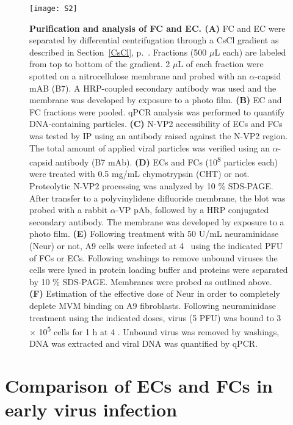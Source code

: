 \begin{figure}
\centering
  \texttt{[image: S2]}
  \caption[Purification and analysis of FC and EC.]
   {\textbf{Purification and analysis of FC and EC. (A)} FC and EC were separated by differential centrifugation through a CsCl gradient as described in Section~\ref{CsCl}, p.~\pageref{CsCl}. Fractions (500 $\mu$L each) are labeled from top to bottom of the gradient. 2 $\mu$L of each fraction were spotted on a nitrocellulose membrane and probed with an $\alpha$-capsid mAB (B7). A HRP-coupled secondary antibody was used and the membrane was developed by exposure to a photo film. \textbf{(B)} EC and FC fractions were pooled. qPCR analysis was performed to quantify DNA-containing particles. \textbf{(C)} N-VP2 accessibility of ECs and FCs was tested by IP using an antibody raised against the N-VP2 region. The total amount of applied viral particles was verified using an $\alpha$-capsid antibody (B7 mAb). \textbf{(D)} ECs and FCs (10\textsuperscript{8} particles each) were treated with 0.5 mg/mL chymotrypsin (CHT) or not. Proteolytic N-VP2 processing was analyzed by 10 \% SDS-PAGE. After transfer to a polyvinylidene difluoride membrane, the blot was probed with a rabbit $\alpha$-VP pAb, followed by a HRP conjugated secondary antibody. The membrane was developed by exposure to a photo film. \textbf{(E)} Following treatment with 50 U/mL neuraminidase (Neur) or not, A9 cells were infected at 4 \textcelsius~using the indicated PFU of FCs or ECs. Following washings to remove unbound viruses the cells were lysed in protein loading buffer and proteins were separated by 10 \% SDS-PAGE. Membranes were probed as outlined above. \textbf{(F)} Estimation of the effective dose of Neur in order to completely deplete MVM binding on A9 fibroblasts. Following neuraminidase treatment using the indicated doses, virus (5 PFU) was bound to 3 $\times$ 10\textsuperscript{5} cells for 1 h at 4 \textcelsius. Unbound virus was removed by washings, DNA was extracted and viral DNA was quantified by qPCR.} 
\label{S2}
\end{figure}



\section{Comparison of ECs and FCs in early virus infection}


